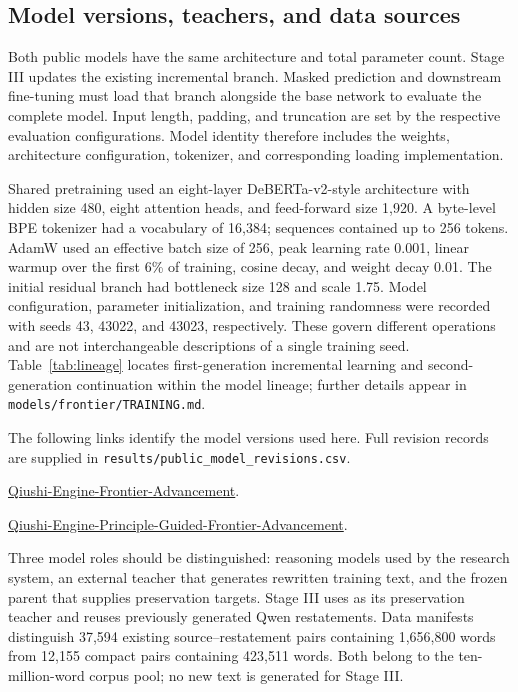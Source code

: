 \subsection{Model versions, teachers, and data sources}

Both public models have the same architecture and total parameter count. Stage III updates the existing incremental branch. Masked prediction and downstream fine-tuning must load that branch alongside the base network to evaluate the complete model. Input length, padding, and truncation are set by the respective evaluation configurations. Model identity therefore includes the weights, architecture configuration, tokenizer, and corresponding loading implementation.

Shared pretraining used an eight-layer DeBERTa-v2-style architecture with hidden size 480, eight attention heads, and feed-forward size 1,920. A byte-level BPE tokenizer had a vocabulary of 16,384; sequences contained up to 256 tokens. AdamW used an effective batch size of 256, peak learning rate 0.001, linear warmup over the first 6\% of training, cosine decay, and weight decay 0.01. The initial residual branch had bottleneck size 128 and scale 1.75. Model configuration, parameter initialization, and training randomness were recorded with seeds 43, 43022, and 43023, respectively. These govern different operations and are not interchangeable descriptions of a single training seed. Table~\ref{tab:lineage} locates first-generation incremental learning and second-generation continuation within the model lineage; further details appear in \nolinkurl{models/frontier/TRAINING.md}.

The following links identify the model versions used here. Full revision records are supplied in \nolinkurl{results/public_model_revisions.csv}.

\begin{description}[font=\normalfont\bfseries,leftmargin=2em,style=nextline]
\item[\Frontier]
\href{https://huggingface.co/leslie721007/Qiushi-Engine-Frontier-Advancement/tree/5eb20f9c5088f40183269bb2c97381711aea0143}{Qiushi-Engine-Frontier-Advancement}.
\item[\Guided]
\href{https://huggingface.co/leslie721007/Qiushi-Engine-Principle-Guided-Frontier-Advancement/tree/ce7eabf0dfbd3d1393670f41f610bdccbdbe45d1}{Qiushi-Engine-Principle-Guided-Frontier-Advancement}.
\end{description}

Three model roles should be distinguished: reasoning models used by the research system, an external teacher that generates rewritten training text, and the frozen parent that supplies preservation targets. Stage III uses \Frontier{} as its preservation teacher and reuses previously generated Qwen restatements. Data manifests distinguish 37,594 existing source--restatement pairs containing 1,656,800 words from 12,155 compact pairs containing 423,511 words. Both belong to the ten-million-word corpus pool; no new text is generated for Stage III.

